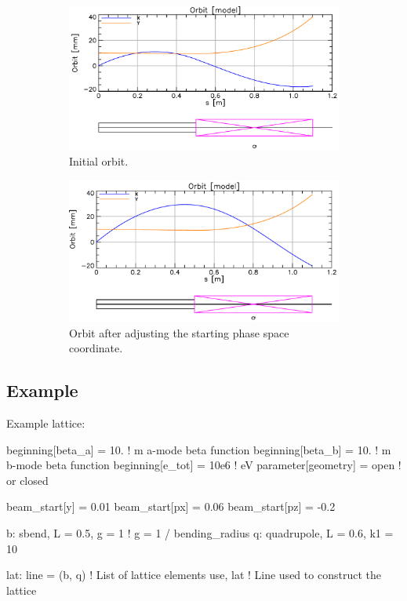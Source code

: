 \documentclass{hitec}
\begin{document}
\begin{figure}[tb]
  \centering
  \begin{subfigure}[b]{0.48\textwidth}
    \includegraphics[width=\textwidth]{phase0.pdf}
    \caption{Initial orbit.}
    \label{f:phase0}
  \end{subfigure}
  \hfil
  \begin{subfigure}[b]{0.48\textwidth}
    \includegraphics[width=\textwidth]{phase1.pdf}
    \caption{Orbit after adjusting the starting  phase space coordinate.}
    \label{f:phase1}
  \end{subfigure}
  \caption{}
\end{figure}

\subsection{Example}

Example lattice:
\begin{code}
beginning[beta_a] = 10.     ! m  a-mode beta function
beginning[beta_b] = 10.     ! m  b-mode beta function
beginning[e_tot] = 10e6     ! eV
parameter[geometry] = open  ! or closed

beam_start[y] = 0.01
beam_start[px] = 0.06
beam_start[pz] = -0.2

b: sbend, L = 0.5, g = 1    ! g = 1 / bending_radius
q: quadrupole, L = 0.6, k1 = 10

lat: line = (b, q)      ! List of lattice elements
use, lat                ! Line used to construct the lattice
\end{code}
\end{document}

